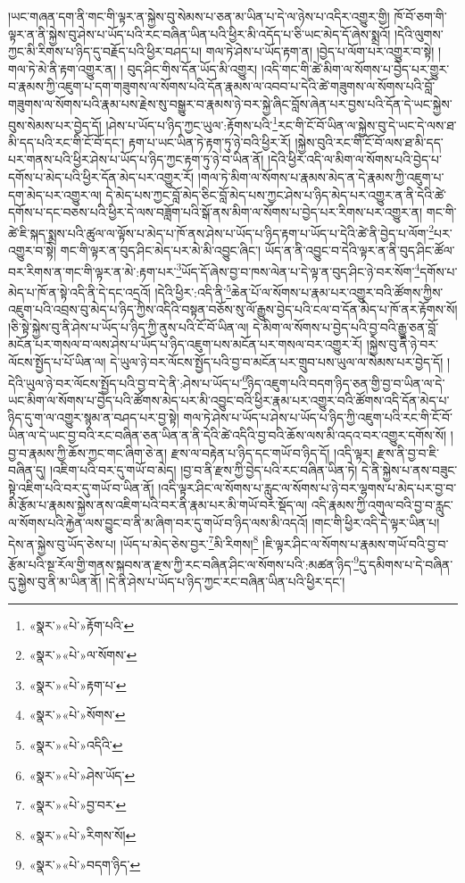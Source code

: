 །ཡང་གཞན་དག་ནི་གང་གི་ལྟར་ན་སྐྱེས་བུ་སེམས་པ་ཅན་མ་ཡིན་པ་དེ་ལ་ཉེས་པ་འདིར་འགྱུར་གྱི། ཁོ་བོ་ཅག་གི་ལྟར་ན་ནི་སྐྱེས་བུ་ཤེས་པ་ཡོད་པའི་རང་བཞིན་ཡིན་པའི་ཕྱིར་མི་འདོད་པ་ཅི་ཡང་མེད་དོ་ཞེས་སྨྲའོ། །དེའི་ལུགས་ཀྱང་མི་རིགས་པ་ཉིད་དུ་བརྗོད་པའི་ཕྱིར་བཤད་པ། གལ་ཏེ་ཤེས་པ་ཡོད་རྟག་ན། །བྱེད་པ་ལོག་པར་འགྱུར་བ་སྟེ། །གལ་ཏེ་མེ་ནི་རྟག་འགྱུར་ན། །
བུད་ཤིང་གིས་དོན་ཡོད་མི་འགྱུར། །འདི་གང་གི་ཚེ་མིག་ལ་སོགས་པ་བྱེད་པར་གྱུར་བ་རྣམས་ཀྱི་འཇུག་པ་དག་གཟུགས་ལ་སོགས་པའི་དོན་རྣམས་ལ་འབབ་པ་དེའི་ཚེ་གཟུགས་ལ་སོགས་པའི་བློ་གཟུགས་ལ་སོགས་པའི་རྣམ་པས་རྗེས་སུ་བསྒྱུར་བ་རྣམས་ཉེ་བར་སྐྱེ་ཞིང་བློས་ཞེན་པར་བྱས་པའི་དོན་དེ་ཡང་སྐྱེས་བུས་སེམས་པར་བྱེད་དོ། །ཤེས་པ་ཡོད་པ་ཉིད་ཀྱང་ཡུལ་:རྟོགས་པའི་\footnote{«སྣར་»«པེ་»རྟོག་པའི་}རང་གི་ངོ་བོ་ཡིན་ལ་སྐྱེས་བུ་དེ་ཡང་དེ་ལས་ཐ་མི་དད་པའི་རང་གི་ངོ་བོ་དང་། རྟག་པ་ཡང་ཡིན་ཏེ་རྟག་ཏུ་ཉེ་བའི་ཕྱིར་རོ། །སྐྱེས་བུའི་རང་གི་ངོ་བོ་ལས་ཐ་མི་དད་པར་གནས་པའི་ཕྱིར་ཤེས་པ་ཡོད་པ་ཉིད་ཀྱང་རྟག་ཏུ་ཉེ་བ་ཡིན་ནོ། །དེའི་ཕྱིར་འདི་ལ་མིག་ལ་སོགས་པའི་བྱེད་པ་དགོས་པ་མེད་པའི་ཕྱིར་དོན་མེད་པར་འགྱུར་རོ། །གལ་ཏེ་མིག་ལ་སོགས་པ་རྣམས་མེད་ན་དེ་རྣམས་ཀྱི་འཇུག་པ་དག་མེད་པར་འགྱུར་ལ། དེ་མེད་པས་ཀྱང་བློ་མེད་ཅིང་བློ་མེད་པས་ཀྱང་ཤེས་པ་ཉིད་མེད་པར་འགྱུར་ན་ནི་དེའི་ཚེ་དགོས་པ་དང་བཅས་པའི་ཕྱིར་དེ་ལས་བཟློག་པའི་སྒོ་ནས་མིག་ལ་སོགས་པ་བྱེད་པར་རིགས་པར་འགྱུར་ན། གང་གི་ཚེ་ཇི་སྐད་སྨྲས་པའི་ཚུལ་ལ་ལྟོས་པ་མེད་པ་ཁོ་ནས་ཤེས་པ་ཡོད་པ་ཉིད་རྟག་པ་ཡོད་པ་དེའི་ཚེ་ནི་བྱེད་པ་ལོག་\footnote{«སྣར་»«པེ་»ལ་སོགས་}པར་འགྱུར་བ་སྟེ། གང་གི་ལྟར་ན་བུད་ཤིང་མེད་པར་མེ་མི་འབྱུང་ཞིང་། ཡོད་ན་ནི་འབྱུང་བ་དེའི་ལྟར་ན་ནི་བུད་ཤིང་ཚོལ་བར་རིགས་ན་གང་གི་ལྟར་ན་མེ་:རྟག་པར་\footnote{«སྣར་»«པེ་»རྟག་པ་}ཡོད་དོ་ཞེས་བྱ་བ་ཁས་ལེན་པ་དེ་ལྟ་ན་བུད་ཤིང་ཉེ་བར་སོག་\footnote{«སྣར་»«པེ་»སོགས་}དགོས་པ་མེད་པ་ཁོ་ན་སྟེ་འདི་ནི་དེ་དང་འདྲའོ། །དེའི་ཕྱིར་:འདི་ནི་\footnote{«སྣར་»«པེ་»འདིའི་}ཆེན་པོ་ལ་སོགས་པ་རྣམ་པར་འགྱུར་བའི་ཚོགས་ཀྱིས་འཇུག་པའི་འབྲས་བུ་མེད་པ་ཉིད་ཀྱིས་འདིའི་བསྟན་བཅོས་སུ་ལོ་རྒྱུས་བྱེད་པའི་ངལ་བ་དོན་མེད་པ་ཁོ་ནར་རྟོགས་སོ། །ཅི་སྟེ་སྐྱེས་བུ་ནི་ཤེས་པ་ཡོད་པ་ཉིད་ཀྱི་ནུས་པའི་ངོ་བོ་ཡིན་ལ། དེ་མིག་ལ་སོགས་པ་བྱེད་པའི་བྱ་བའི་རྒྱུ་ཅན་བློ་མངོན་པར་གསལ་བ་ལས་ཤེས་པ་ཡོད་པ་ཉིད་འཇུག་པས་མངོན་པར་གསལ་བར་འགྱུར་རོ། །སྐྱེས་བུ་ནི་ཉེ་བར་ལོངས་སྤྱོད་པ་པོ་ཡིན་ལ། དེ་ཡུལ་ཉེ་བར་ལོངས་སྤྱོད་པའི་བྱ་བ་མངོན་པར་གྲུབ་པས་ཡུལ་ལ་སེམས་པར་བྱེད་དོ། །དེའི་ཡུལ་ཉེ་བར་ལོངས་སྤྱོད་པའི་བྱ་བ་དེ་ནི་:ཤེས་པ་ཡོད་པ་\footnote{«སྣར་»«པེ་»ཤེས་ཡོད་}ཉིད་འཇུག་པའི་བདག་ཉིད་ཅན་གྱི་བྱ་བ་ཡིན་ལ་དེ་ཡང་མིག་ལ་སོགས་པ་བྱེད་པའི་ཚོགས་མེད་པར་མི་འབྱུང་བའི་ཕྱིར་རྣམ་པར་འགྱུར་བའི་ཚོགས་འདི་དོན་མེད་པ་ཉིད་དུ་ག་ལ་འགྱུར་སྙམ་ན་བཤད་པར་བྱ་སྟེ། གལ་ཏེ་ཤེས་པ་ཡོད་པ་ཤེས་པ་ཡོད་པ་ཉིད་ཀྱི་འཇུག་པའི་རང་གི་ངོ་བོ་ཡིན་ལ་དེ་ཡང་བྱ་བའི་རང་བཞིན་ཅན་ཡིན་ན་ནི་དེའི་ཚེ་འདིའི་བྱ་བའི་ཆོས་ལས་མི་འདའ་བར་འགྱུར་དགོས་སོ། །བྱ་བ་རྣམས་ཀྱི་ཆོས་ཀྱང་གང་ཞིག་ཅེ་ན། རྫས་ལ་བརྟེན་པ་ཉིད་དང་གཡོ་བ་ཉིད་དོ། །འདི་ལྟར། རྫས་ནི་བྱ་བ་ཇི་བཞིན་དུ། །འཇིག་པའི་བར་དུ་གཡོ་བ་མེད། །བྱ་བ་ནི་རྫས་ཀྱི་བྱེད་པའི་རང་བཞིན་ཡིན་ཏེ། དེ་ནི་སྐྱེས་པ་ནས་བཟུང་སྟེ་འཇིག་པའི་བར་དུ་གཡོ་བ་ཡིན་ནོ། །འདི་ལྟར་ཤིང་ལ་སོགས་པ་རླུང་ལ་སོགས་པ་ཉེ་བར་ལྷགས་པ་མེད་པར་བྱ་བ་མི་རྩོམ་པ་རྣམས་སྐྱེས་ནས་འཇིག་པའི་བར་ནི་རྣམ་པར་མི་གཡོ་བར་སྡོད་ལ། འདི་རྣམས་ཀྱི་འགུལ་བའི་བྱ་བ་རླུང་ལ་སོགས་པའི་རྐྱེན་ལས་བྱུང་བ་ནི་མ་ཞིག་བར་དུ་གཡོ་བ་ཉིད་ལས་མི་འདའོ། །གང་གི་ཕྱིར་འདི་དེ་ལྟར་ཡིན་པ། དེས་ན་སྐྱེས་བུ་ཡོད་ཅེས་པ། །ཡོད་པ་མེད་ཅེས་བྱར་\footnote{«སྣར་»«པེ་»བྱ་བར་}མི་རིགས།\footnote{«སྣར་»«པེ་»རིགས་སོ།} །ཇི་ལྟར་ཤིང་ལ་སོགས་པ་རྣམས་གཡོ་བའི་བྱ་བ་རྩོམ་པའི་སྔ་རོལ་གྱི་གནས་སྐབས་ན་རྫས་ཀྱི་རང་བཞིན་ཤིང་ལ་སོགས་པའི་:མཚན་ཉིད་\footnote{«སྣར་»«པེ་»བདག་ཉིད་}དུ་དམིགས་པ་དེ་བཞིན་དུ་སྐྱེས་བུ་ནི་མ་ཡིན་ནོ། །དེ་ནི་ཤེས་པ་ཡོད་པ་ཉིད་ཀྱང་རང་བཞིན་ཡིན་པའི་ཕྱིར་དང་། 